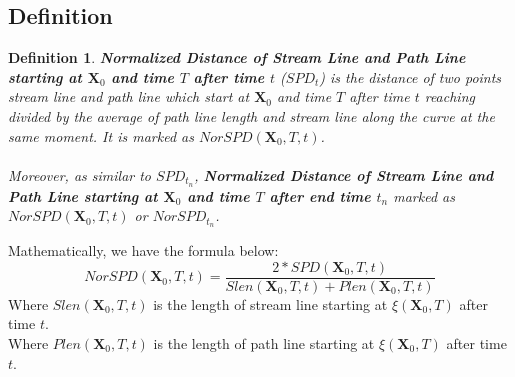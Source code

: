 \documentclass[
     11pt,         %
     a4paper,      %
     oneside,
     ]{article}
\newtheorem{mydef}{Definition}
\newcommand{\vect}[1]{\boldsymbol{#1}}
\begin{document}
	\subsection{Definition} 
    \begin{mydef}
    	\textbf{\textit{Normalized Distance of Stream Line and Path Line starting at $\vect{X}_{0}$ and time $T$ after time $t$}} (\textbf{\textit{$SPD_{t}$}}) is the distance of two points stream line and path line which start at $\vect{X}_{0}$ and time $T$ after time $t$ reaching divided by the average of path line length and stream line along the curve at the same moment. It is marked as $NorSPD(\vect{X}_{0},T,t)$.\\
    	\\
    	Moreover, as similar to $SPD_{t_{n}}$, \textbf{\textit{Normalized Distance of Stream Line and Path Line starting at $\vect{X}_{0}$ and time $T$ after end time $t_{n}$}} marked as $NorSPD(\vect{X}_{0},T,t)$ or $NorSPD_{t_{n}}$.
    \end{mydef}
	 
	 Mathematically, we have the formula below:
	 \begin{equation}
	 \label{Equation:NorSPD}
	 NorSPD(\vect{X}_{0},T,t)=\frac{2*SPD(\vect{X}_{0},T,t)}{Slen(\vect{X}_{0},T,t)+Plen(\vect{X}_{0},T,t)}
	 \end{equation}
	 	Where $Slen(\vect{X}_{0},T,t)$ is the length of stream line starting at $\xi(\vect{X}_{0},T)$ after time $t$.\\
	 	Where $Plen(\vect{X}_{0},T,t)$ is the length of path line starting at $\xi(\vect{X}_{0},T)$ after time $t$.\\
	 
\end{document}

